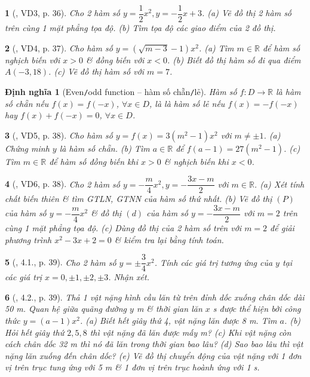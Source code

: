 \documentclass{article}
\newtheorem{baitoan}{}
\newtheorem{dinhnghia}{Định nghĩa}
\begin{document}
\begin{baitoan}[\cite{Binh_boi_duong_Toan_9_tap_2}, VD3, p. 36]
	Cho 2 hàm số $y = \dfrac{1}{2}x^2,y = -\dfrac{1}{2}x + 3$. (a) Vẽ đồ thị 2 hàm số trên cùng 1 mặt phẳng tọa độ. (b) Tìm tọa độ các giao điểm của 2 đồ thị.
\end{baitoan}

\begin{baitoan}[\cite{Binh_boi_duong_Toan_9_tap_2}, VD4, p. 37]
	Cho hàm số $y = (\sqrt{m - 3} - 1)x^2$. (a) Tìm $m\in\mathbb{R}$ để hàm số nghịch biến với $x > 0$ \& đồng biến với $x < 0$. (b) Biết đồ thị hàm số đi qua điểm $A(-3,18)$. (c) Vẽ đồ thị hàm số với $m = 7$.
\end{baitoan}

\begin{dinhnghia}[Even{\tt/}odd function -- hàm số chẵn{\tt/}lẻ]
	Hàm số $f:D\to\mathbb{R}$ là {\rm hàm số chẵn} nếu $f(x) = f(-x)$, $\forall x\in D$, là là {\rm hàm số lẻ} nếu $f(x) = -f(-x)$ hay $f(x) + f(-x) = 0$, $\forall x\in D$.
\end{dinhnghia}

\begin{baitoan}[\cite{Binh_boi_duong_Toan_9_tap_2}, VD5, p. 38]
	Cho hàm số $y = f(x) = 3(m^2 - 1)x^2$ với $m\ne\pm1$. (a) Chứng minh $y$ là hàm số chẵn. (b) Tìm $a\in\mathbb{R}$ để $f(a - 1) = 27(m^2 - 1)$. (c) Tìm $m\in\mathbb{R}$ để hàm số đồng biến khi $x > 0$ \& nghịch biến khi $x < 0$.
\end{baitoan}

\begin{baitoan}[\cite{Binh_boi_duong_Toan_9_tap_2}, VD6, p. 38]
	Cho 2 hàm số $y = -\dfrac{m}{4}x^2,y = -\dfrac{3x - m}{2}$ với $m\in\mathbb{R}$. (a) Xét tính chất biến thiên \& tìm {\rm GTLN, GTNN} của hàm số thứ nhất. (b) Vẽ đồ thị $(P)$ của hàm số $y = -\dfrac{m}{4}x^2$ \& đồ thị $(d)$ của hàm số $y = -\dfrac{3x - m}{2}$ với $m = 2$ trên cùng 1 mặt phẳng tọa độ. (c) Dùng đồ thị của 2 hàm số trên với $m = 2$ để giải phương trình $x^2 - 3x + 2 = 0$ \& kiểm tra lại bằng tính toán.
\end{baitoan}

\begin{baitoan}[\cite{Binh_boi_duong_Toan_9_tap_2}, 4.1., p. 39]
	Cho 2 hàm số $y = \pm\dfrac{3}{4}x^2$. Tính các giá trị tương ứng của $y$ tại các giá trị $x = 0,\pm1,\pm2,\pm3$. Nhận xét.
\end{baitoan}

\begin{baitoan}[\cite{Binh_boi_duong_Toan_9_tap_2}, 4.2., p. 39]
	Thả 1 vật nặng hình cầu lăn từ trên đỉnh dốc xuống chân dốc dài {\rm50 m}. Quan hệ giữa quãng đường $y$ {\rm m} \& thời gian lăn $x$ {\rm s} được thể hiện bởi công thức $y = (a - 1)x^2$. (a) Biết hết giây thứ 4, vật nặng lăn được {\rm8 m}. Tìm $a$. (b) Hỏi hết giây thứ $2,5,8$ thì vật nặng đã lăn được mấy {\rm m}? (c) Khi vật nặng còn cách chân dốc {\rm32 m} thì nó đã lăn trong thời gian bao lâu? (d) Sao bao lâu thì vật nặng lăn xuống đến chân dốc? (e) Vẽ đồ thị chuyển động của vật nặng với 1 đơn vị trên trục tung ứng với {\rm5 m} \& 1 đơn vị trên trục hoành ứng với {\rm1 s}.
\end{baitoan}
\end{document}
